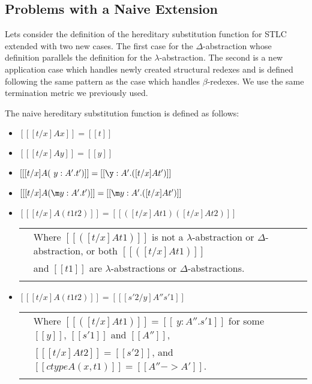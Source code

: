 \subsection{Problems with a Naive Extension}
\label{subsec:the_naive_extension}
Lets consider the definition of the hereditary substitution function
for STLC extended with two new cases. The first case for the $\Delta$-abstraction
whose definition parallels the definition for the
$\lambda$-abstraction.  The second is a new application case which
handles newly created structural redexes and is defined following the
same pattern as the case which handles $\beta$-redexes.  We use the same termination
metric we previously used. 
\begin{definition}
  \label{def:hereditary_substitution_function}
  The naive hereditary substitution function is defined as follows:
  \small
  \begin{itemize}
  \item[] $[[ [t/x] A x]] = [[t]]$
  \item[] $[[ [t/x] A y]] = [[y]]$\\

  \item[] $[[ [t/x] A (\ y:A'.t')]] = [[\y:A'.([t/x ] A t')]]$
  \item[] $[[ [t/x] A (\m y:A'.t')]] = [[\m y:A'.([t/x] A t')]]$\\

  \item[] $[[ [t/x] A (t1 t2)]] = [[([t/x] A t1) ([t/x] A t2)]]$\\
    \begin{tabular}{lll}
      & Where $[[([t/x] A t1)]]$ is not a $\lambda$-abstraction or $\Delta$-abstraction,  or both $[[([t/x] A t1)]]$ \\
      & and  $[[t1]]$ are $\lambda$-abstractions or $\Delta$-abstractions.\\
      & \\
    \end{tabular}

  \item[] $[[ [t/x] A (t1 t2)]] = [[ [s'2/y] A'' s'1]]$\\
    \begin{tabular}{lll}
      & Where $[[([t/x] A t1)]] = [[\ y:A''.s'1]]$ for some $[[y]]$, $[[s'1]]$ and $[[A'']]$, \\
      & $[[ [t/x] A t2]] = [[s'2]]$, and $[[ctype A (x,t1)]] = [[A'' -> A']]$. \\
      & \\
    \end{tabular}


\end{itemize}
\end{definition}
